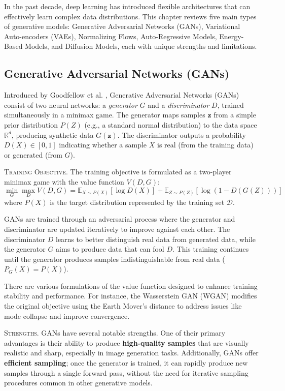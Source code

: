 In the past decade, deep learning has introduced flexible architectures that can effectively learn complex data distributions. This chapter reviews five main types of generative models: Generative Adversarial Networks (GANs), Variational Auto-encoders (VAEs), Normalizing Flows, Auto-Regressive Models, Energy-Based Models, and Diffusion Models, each with unique strengths and limitations.

\subsection{Generative Adversarial Networks (GANs)}

Introduced by Goodfellow et al. \cite{goodfellow2014generative}, Generative Adversarial Networks (GANs) consist of two neural networks: a \textit{generator} \( G \) and a \textit{discriminator} \( D \), trained simultaneously in a minimax game. The generator maps samples \( \mathbf{z} \) from a simple prior distribution \( P(Z) \) (e.g., a standard normal distribution) to the data space \( \mathbb{R}^d \), producing synthetic data \( G(\mathbf{z}) \). The discriminator outputs a probability \( D(X) \in [0,1] \) indicating whether a sample \( X \) is real (from the training data) or generated (from \( G \)).

\textsc{Training Objective.} The training objective is formulated as a two-player minimax game with the value function \( V(D, G) \):
\[
\min_{G} \max_{D} V(D, G) = \mathbb{E}_{X \sim P(X)} [\log D(X)] + \mathbb{E}_{Z \sim P(Z)} [\log (1 - D(G(Z)))]
\]
where \( P(X) \) is the target distribution represented by the training set \( \mathcal{D} \).


GANs are trained through an adversarial process where the generator and discriminator are updated iteratively to improve against each other. The discriminator \( D \) learns to better distinguish real data from generated data, while the generator \( G \) aims to produce data that can fool \( D \). This training continues until the generator produces samples indistinguishable from real data (\( P_G(X) = P(X) \)).

There are various formulations of the value function designed to enhance training stability and performance. For instance, the Wasserstein GAN (WGAN) \cite{arjovsky2017wasserstein} modifies the original objective using the Earth Mover's distance to address issues like mode collapse and improve convergence.

\textsc{Strengths.} GANs have several notable strengths. One of their primary advantages is their ability to produce \textbf{high-quality samples} that are visually realistic and sharp, especially in image generation tasks. Additionally, GANs offer \textbf{efficient sampling}; once the generator is trained, it can rapidly produce new samples through a single forward pass, without the need for iterative sampling procedures common in other generative models.

